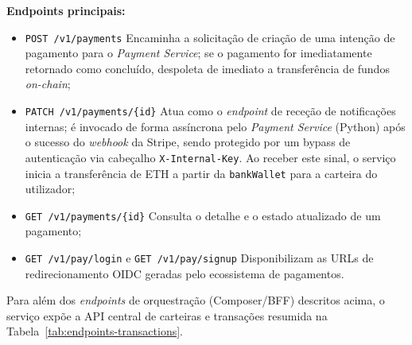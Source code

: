 \documentclass[12pt,a4paper]{article}
\begin{document}
\textbf{Endpoints principais:}
\begin{itemize}[noitemsep]
  \item \texttt{POST /v1/payments} Encaminha a solicitação de criação de uma intenção de 
        pagamento para o \emph{Payment Service}; se o pagamento for imediatamente retornado como concluído, despoleta de imediato a transferência de fundos \emph{on-chain};
  \item \texttt{PATCH /v1/payments/\{id\}} Atua como o \emph{endpoint} de receção de 
        notificações internas; é invocado de forma assíncrona pelo \emph{Payment Service} (Python) após o sucesso do \emph{webhook} da Stripe, sendo protegido por um bypass de autenticação via cabeçalho \texttt{X-Internal-Key}. Ao receber este sinal, o serviço inicia a transferência de ETH a partir da \texttt{bankWallet} para a carteira do utilizador;
  \item \texttt{GET /v1/payments/\{id\}} Consulta o detalhe e o estado atualizado de um pagamento;
  \item \texttt{GET /v1/pay/login} e \texttt{GET /v1/pay/signup} Disponibilizam as URLs de redirecionamento OIDC geradas pelo ecossistema de pagamentos.
\end{itemize}

Para além dos \emph{endpoints} de orquestração (Composer/BFF) descritos acima, o serviço
expõe a API central de carteiras e transações resumida na Tabela~\ref{tab:endpoints-transactions}.
\end{document}
